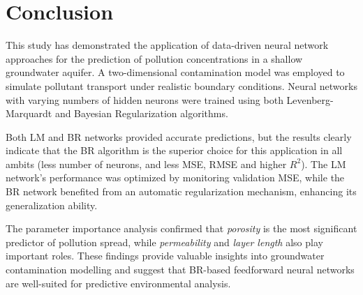 \documentclass[10pt]{article}
\begin{document}
	\section{Conclusion}
	This study has demonstrated the application of data-driven neural network approaches for the prediction of pollution concentrations in a shallow groundwater aquifer. A two-dimensional contamination model was employed to simulate pollutant transport under realistic boundary conditions. Neural networks with varying numbers of hidden neurons were trained using both Levenberg-Marquardt and Bayesian Regularization algorithms.
	
	Both LM and BR networks provided accurate predictions, but the results clearly indicate that the BR algorithm is the superior choice for this application in all ambits (less number of neurons, and less MSE, RMSE and higher $R^2$). The LM network’s performance was optimized by monitoring validation MSE, while the BR network benefited from an automatic regularization mechanism, enhancing its generalization ability.
	
	The parameter importance analysis confirmed that \textit{porosity} is the most significant predictor of pollution spread, while \textit{permeability} and \textit{layer length} also play important roles. These findings provide valuable insights into groundwater contamination modelling and suggest that BR-based feedforward neural networks are well-suited for predictive environmental analysis.
	
	
	
\end{document}
